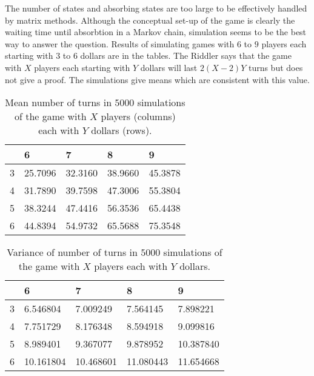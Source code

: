 \documentclass[12pt]{article}
\begin{document}
\begin{example}
  The number of states and absorbing states are too large to be
  effectively handled by matrix methods.  Although the conceptual
  set-up of the game is clearly the waiting time until absorbtion in a
  Markov chain, simulation seems to be the best way to answer the
  question.  Results of simulating games with $6$ to $9$ players each
  starting with $3$ to $6$ dollars are in the tables.  The Riddler
  says that the game with $X$ players each starting with $Y$ dollars
  will last $2(X-2)Y$ turns but does not give a proof.
  The simulations give means which are consistent with this value.
  \begin{table}
    \centering
    \begin{tabular}{l | llll}
      &  6       & 7       & 8       & 9      \\
     \hline
     3 &  25.7096 & 32.3160 & 38.9660 & 45.3878 \\
     4 &  31.7890 & 39.7598 & 47.3006 & 55.3804 \\
     5 &  38.3244 & 47.4416 & 56.3536 & 65.4438 \\
     6 &  44.8394 & 54.9732 & 65.5688 & 75.3548
    \end{tabular}
    \caption{Mean number of turns in $5000$ simulations of the game
      with $X$ players (columns) each with $Y$ dollars (rows).}
    \label{tab:waitingtimeabsorbtion:lcrmean}
  \end{table}

  \begin{table}
    \centering
    \begin{tabular}{l | llll}
      &  6       & 7       & 8       & 9      \\
     \hline
     3&   6.546804 &  7.009249 &  7.564145 &  7.898221 \\
     4& 7.751729 &  8.176348 &  8.594918 &  9.099816 \\
     5&  8.989401 &  9.367077 &  9.878952 & 10.387840 \\
     6&  10.161804 & 10.468601 & 11.080443 & 11.654668
\end{tabular}
    \caption{Variance of number of turns in $5000$ simulations of the game
      with $X$ players each with $Y$ dollars.}
    \label{tab:waitingtimeabsorbtion:lcrmean}
  \end{table}





\end{example}
\end{document}
